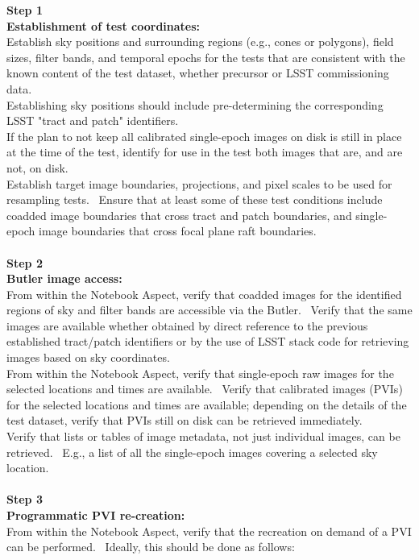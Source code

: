 \textbf{Step 1}\\
\textbf{Establishment of test coordinates:}\\
Establish sky positions and surrounding regions (e.g., cones or
polygons), field sizes, filter bands, and temporal epochs for the tests
that are consistent with the known content of the test dataset, whether
precursor or LSST commissioning data.\\
Establishing sky positions should include pre-determining the
corresponding LSST "tract and patch" identifiers.\\
If the plan to not keep all calibrated single-epoch images on disk is
still in place at the time of the test, identify for use in the test
both images that are, and are not, on disk.\\
Establish target image boundaries, projections, and pixel scales to be
used for resampling tests. ~Ensure that at least some of these test
conditions include coadded image boundaries that cross tract and patch
boundaries, and single-epoch image boundaries that cross focal plane
raft boundaries.\\
~\\
\textbf{Step 2}\\
\textbf{Butler image access:}\\
From within the Notebook Aspect, verify that coadded images for the
identified regions of sky and filter bands are accessible via the
Butler. ~Verify that the same images are available whether obtained by
direct reference to the previous established tract/patch identifiers or
by the use of LSST stack code for retrieving images based on sky
coordinates.\\
From within the Notebook Aspect, verify that single-epoch raw images for
the selected locations and times are available. ~Verify that calibrated
images (PVIs) for the selected locations and times are available;
depending on the details of the test dataset, verify that PVIs still on
disk can be retrieved immediately.\\
Verify that lists or tables of image metadata, not just individual
images, can be retrieved. ~E.g., a list of all the single-epoch images
covering a selected sky location.\\
~\\
\textbf{Step 3}\\
\textbf{Programmatic PVI re-creation:}\\
From within the Notebook Aspect, verify that the recreation on demand of
a PVI can be performed. ~Ideally, this should be done as follows:

